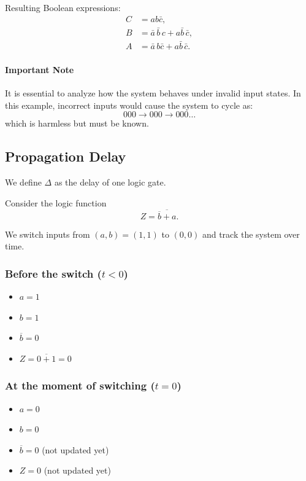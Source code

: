 \documentclass{article}
\begin{document}
Resulting Boolean expressions:
\[
\begin{aligned}
C &= a b \bar{c}, \\
B &= \bar{a}\,\bar{b}\,c + a\bar{b}\,\bar{c}, \\
A &= \bar{a}\,b\bar{c} + a\bar{b}\,\bar{c}.
\end{aligned}
\]

\paragraph{Important Note}
It is essential to analyze how the system behaves under invalid input states.  
In this example, incorrect inputs would cause the system to cycle as:
\[
000 \to 000 \to 000 \dots
\]
which is harmless but must be known.

\subsection{Propagation Delay}

We define $\Delta$ as the delay of one logic gate.

Consider the logic function
\[
Z = \overline{\overline{b} + a}.
\]

We switch inputs from $(a,b)=(1,1)$ to $(0,0)$ and track the system over time.

\subsubsection*{Before the switch ($t < 0$)}
\begin{itemize}
    \item $a = 1$
    \item $b = 1$
    \item $\overline{b} = 0$
    \item $Z = \overline{0 + 1} = 0$
\end{itemize}

\subsubsection*{At the moment of switching ($t = 0$)}
\begin{itemize}
    \item $a = 0$
    \item $b = 0$
    \item $\overline{b} = 0$ (not updated yet)
    \item $Z = 0$ (not updated yet)
\end{itemize}
\end{document}
